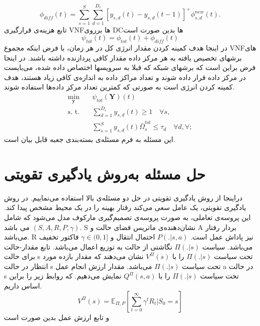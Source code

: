 \begin{equation*}
	\textstyle \phi_{diff}(t) = \sum_{s=1}^{S}\sum_{d=1}^{D_c}[y_{s,d}(t)-y_{s,d}(t-1)]^+\phi_{s,d}^{new}(t).
\end{equation*}
تابع هزینه‌ی قرارگیری VNFها برروی DCها بدین صورت است
\begin{equation}\label{eqpsi}
	\textstyle  \psi_{tot}(t) = \phi_{tot}(t) + \phi_{diff}(t)
\end{equation}
در اینجا هدف کمینه کردن مقدار انرژی کل در هر زمان، با فرض اینکه مجموع VNFهای برشهای تخصیص یافته به هر مرکز داده مقدار کافی پردازنده داشته باشند. در اینجا فرض براین است که برشهای شبکه که قبلا به سرویسها اختصاص داده شده، می‌بایست در مرکز داده قرار داده شوند و تعداد مراکز داده به اندازه‌ی کافی زیاد هستند، هدف کمینه کردن انرژی است به صورتی که کمترین تعداد مرکز داده‌ها استفاده شوند.
\begin{subequations}
	\begin{alignat}{4}
		\min\limits_{\boldsymbol{y} }   \quad &   \psi_{tot}(\boldsymbol{Y})(t)\\
		\text{s. t.} \quad & \textstyle \sum_{d=1}^{D_c} y_{s,d}(t) \geq 1 \quad \forall s, \\
		&\textstyle  \sum_{s=1}^{S} y_{s,d}(t) \bar{\Omega}_{s}^{tot}  \leq   \tau_{d} \quad  \forall d, \forall ;  \label{eqomega}
	\end{alignat}
\end{subequations}
این مسئله به فرم مسئله‌ی بسته‌بندی جعبه قابل بیان است.
\section{حل مسئله به‌روش یادگیری تقویتی}
دراینجا از روش یادگیری تقویتی در حل دو مسئله‌ی بالا استفاده می‌نماییم.
در روش یادگیری تقویتی، یک عامل سعی می‌کند رفتار بهینه را در یک محیط مشخص پیدا کند. این پروسه‌ی تعاملی، به صورت پروسه‌ی تصمیم‌گیری مارکوف مدل می‌شود که شامل $(S,A,R,P,\gamma)$  می باشد.
S
نشان‌دهنده‌ی ماتریس فضای حالت و A بردار رفتار می‌باشد. R نیز پاداش عمل است. 
$P(.|s,a)$
احتمال انتقال و
 $\gamma \in (0,1]$
 فاکتور تخفیف می‌باشد.
 سیاست 
$\Pi(.|s)$
نگاشتی از حالت به توزیع اعمال می‌باشد.
تابع مقدار-حالت برای حالت s تحت سیاست $\Pi(.|s)$ را با  
$V^{\Pi}(s)$
نشان می‌دهند که مقدار بازده مورد انتظار در حالت s تحت سیاست $\Pi(.|s)$
می‌باشد. مقدار ارزش انجام عمل a در حالت s تحت سیاست $\Pi(.|s)$ 
را با
 $Q^{\Pi}(s,a)$
 نمایش می‌دهیم.
 که روابط زیر را براین اساس داریم.
 \begin{equation}
	V^{\Pi}(s) = \mathbb{E}_{\Pi,P}[\sum_{t=0}^{\infty}\gamma^tR_t|S_0=s]
 \end{equation}
و تابع ارزش عمل بدین صورت است

